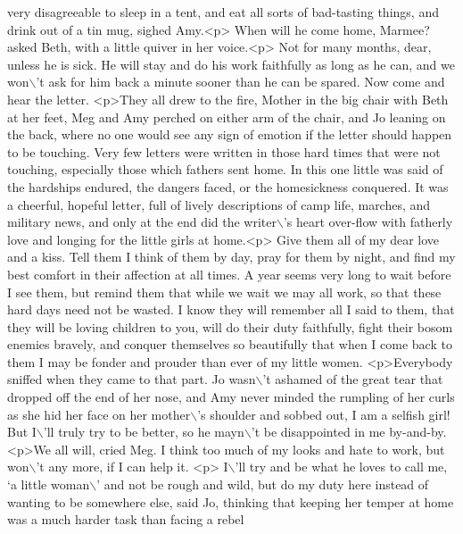 \begin{DoxyCode}
{       very disagreeable to sleep in a tent, and eat all sorts of bad-tasting things, and drink out of a tin mug, 
       sighed Amy.<p> When will he come home, Marmee? asked Beth, with a little quiver in her voice.<p> Not for many
       months, dear, unless he is sick. He will stay and do his work faithfully as long as he can, and we won\(\backslash\)'t
       ask for him back a minute sooner than he can be spared. Now come and hear the letter. <p>They all drew to the
       fire, Mother in the big chair with Beth at her feet, Meg and Amy perched on either arm of the chair, and Jo
       leaning on the back, where no one would see any sign of emotion if the letter should happen to be touching.
       Very few letters were written in those hard times that were not touching, especially those which fathers
       sent home. In this one little was said of the hardships endured, the dangers faced, or the homesickness
       conquered. It was a cheerful, hopeful letter, full of lively descriptions of camp life, marches, and military
       news, and only at the end did the writer\(\backslash\)'s heart over-flow with fatherly love and longing for the little girls
       at home.<p>  Give them all of my dear love and a kiss. Tell them I think of them by day, pray for them by
       night, and find my best comfort in their affection at all times. A year seems very long to wait before I see
       them, but remind them that while we wait we may all work, so that these hard days need not be wasted. I know
       they will remember all I said to them, that they will be loving children to you, will do their duty
       faithfully, fight their bosom enemies bravely, and conquer themselves so beautifully that when I come back to them I
       may be fonder and prouder than ever of my little women. <p>Everybody sniffed when they came to that part.
       Jo wasn\(\backslash\)'t ashamed of the great tear that dropped off the end of her nose, and Amy never minded the rumpling
       of her curls as she hid her face on her mother\(\backslash\)'s shoulder and sobbed out,  I am a selfish girl! But I\(\backslash\)'ll
       truly try to be better, so he mayn\(\backslash\)'t be disappointed in me by-and-by. <p>We all will,  cried Meg.  I think
       too much of my looks and hate to work, but won\(\backslash\)'t any more, if I can help it. <p> I\(\backslash\)'ll try and be what he
       loves to call me, `a little woman\(\backslash\)' and not be rough and wild, but do my duty here instead of wanting to be
       somewhere else,  said Jo, thinking that keeping her temper at home was a much harder task than facing a rebel
}
\end{DoxyCode}
